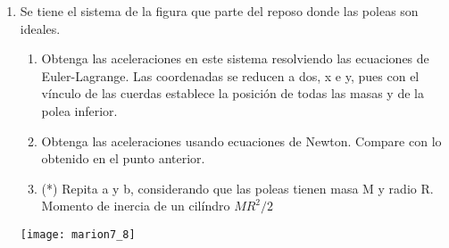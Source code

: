 \documentclass[11pt,spanish,a4paper]{article}
\begin{document}
\begin{enumerate}
\item \begin{minipage}[t][11cm]{0.65\textwidth}
Se tiene el sistema de la figura que parte del reposo donde las poleas son ideales.
\begin{enumerate}
	\item Obtenga las aceleraciones en este sistema resolviendo las ecuaciones de Euler-Lagrange.
	Las coordenadas se reducen a dos, x e y, pues con el vínculo de las cuerdas establece la posición de todas las masas y de la polea inferior.
	\item Obtenga las aceleraciones usando ecuaciones de Newton.
	Compare con lo obtenido en el punto anterior.
	\item (*) Repita a y b, considerando que las poleas tienen masa M y radio R.
	Momento de inercia de un cilíndro \(MR^2/2\)
\end{enumerate}
\end{minipage}
\begin{minipage}[c][0.5em][t]{0.3\textwidth}
	\texttt{[image: marion7\_8]}
\end{minipage}




\end{enumerate}
\end{document}
